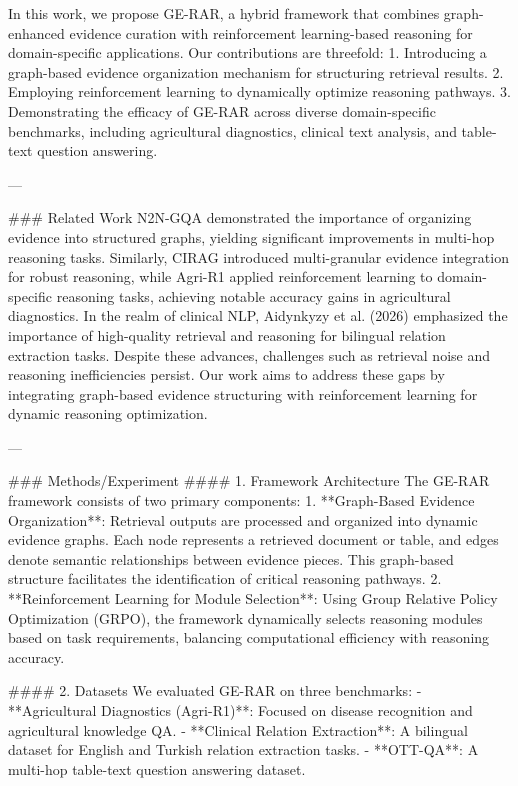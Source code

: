 In this work, we propose GE-RAR, a hybrid framework that combines graph-enhanced evidence curation with reinforcement learning-based reasoning for domain-specific applications. Our contributions are threefold:  
1. Introducing a graph-based evidence organization mechanism for structuring retrieval results.  
2. Employing reinforcement learning to dynamically optimize reasoning pathways.  
3. Demonstrating the efficacy of GE-RAR across diverse domain-specific benchmarks, including agricultural diagnostics, clinical text analysis, and table-text question answering.  

---

### Related Work  
N2N-GQA demonstrated the importance of organizing evidence into structured graphs, yielding significant improvements in multi-hop reasoning tasks. Similarly, CIRAG introduced multi-granular evidence integration for robust reasoning, while Agri-R1 applied reinforcement learning to domain-specific reasoning tasks, achieving notable accuracy gains in agricultural diagnostics. In the realm of clinical NLP, Aidynkyzy et al. (2026) emphasized the importance of high-quality retrieval and reasoning for bilingual relation extraction tasks. Despite these advances, challenges such as retrieval noise and reasoning inefficiencies persist. Our work aims to address these gaps by integrating graph-based evidence structuring with reinforcement learning for dynamic reasoning optimization.

---

### Methods/Experiment  
#### 1. Framework Architecture  
The GE-RAR framework consists of two primary components:  
1. **Graph-Based Evidence Organization**: Retrieval outputs are processed and organized into dynamic evidence graphs. Each node represents a retrieved document or table, and edges denote semantic relationships between evidence pieces. This graph-based structure facilitates the identification of critical reasoning pathways.  
2. **Reinforcement Learning for Module Selection**: Using Group Relative Policy Optimization (GRPO), the framework dynamically selects reasoning modules based on task requirements, balancing computational efficiency with reasoning accuracy.  

#### 2. Datasets  
We evaluated GE-RAR on three benchmarks:  
- **Agricultural Diagnostics (Agri-R1)**: Focused on disease recognition and agricultural knowledge QA.  
- **Clinical Relation Extraction**: A bilingual dataset for English and Turkish relation extraction tasks.  
- **OTT-QA**: A multi-hop table-text question answering dataset.  

